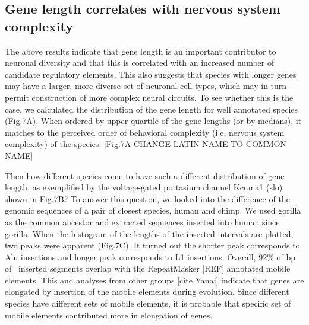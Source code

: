 \subsection{Gene length correlates with nervous system complexity}

The above results indicate that gene length is an important contributor to neuronal diversity and that this is correlated with an increased number of candidate regulatory elements. This also suggests that species with longer genes may have a larger, more diverse set of neuronal cell types, which may in turn permit construction of more complex neural circuits. To see whether this is the case, we calculated the distribution of the gene length for well annotated species (Fig.7A). When ordered by upper quartile of the gene lengths (or by medians), it matches to the perceived order of behavioral complexity (i.e. nervous system complexity) of the species. [Fig.7A CHANGE LATIN NAME TO COMMON NAME]

Then how different species come to have such a different distribution of gene length, as exemplified by the voltage-gated pottasium channel Kcnma1 (slo) shown in Fig.7B? To answer this question, we looked into the difference of the genomic sequences of a pair of closest species, human and chimp. We used gorilla as the common ancestor and extracted sequences inserted into human since gorilla. When the histogram of the lengths of the inserted intervals are plotted, two peaks were apparent (Fig.7C). It turned out the shorter peak corresponds to Alu insertions and longer peak corresponds to L1 insertions. Overall, 92\% of bp of \ inserted segments overlap with the RepeatMasker [REF] annotated mobile elements. This and analyses from other groups [cite Yanai] indicate that genes are elongated by insertion of the mobile elements during evolution. Since different species have different sets of mobile elements, it is probable that specific set of mobile elements contributed more in elongation of genes.
